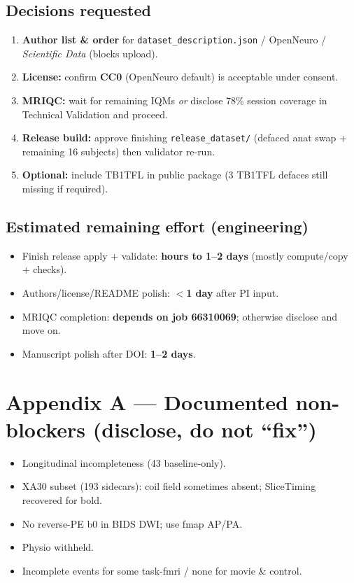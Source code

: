 \documentclass[11pt,a4paper]{article}
\begin{document}
\subsection*{Decisions requested}

\begin{enumerate}[leftmargin=1.3em,itemsep=4pt]
\item \textbf{Author list \& order} for \texttt{dataset\_description.json} / OpenNeuro / \textit{Scientific Data} (blocks upload).
\item \textbf{License:} confirm \textbf{CC0} (OpenNeuro default) is acceptable under consent.
\item \textbf{MRIQC:} wait for remaining IQMs \emph{or} disclose 78\% session coverage in Technical Validation and proceed.
\item \textbf{Release build:} approve finishing \texttt{release\_dataset/} (defaced anat swap + remaining 16 subjects) then validator re-run.
\item \textbf{Optional:} include TB1TFL in public package (3 TB1TFL defaces still missing if required).
\end{enumerate}

\subsection*{Estimated remaining effort (engineering)}
\begin{itemize}[leftmargin=1.2em,itemsep=1pt]
\item Finish release apply + validate: \textbf{hours to 1--2 days} (mostly compute/copy + checks).
\item Authors/license/README polish: \textbf{$<$1 day} after PI input.
\item MRIQC completion: \textbf{depends on job 66310069}; otherwise disclose and move on.
\item Manuscript polish after DOI: \textbf{1--2 days}.
\end{itemize}

\section*{Appendix A --- Documented non-blockers (disclose, do not ``fix'')}
\begin{itemize}[leftmargin=1.2em,itemsep=1pt]
\item Longitudinal incompleteness (43 baseline-only).
\item XA30 subset (193 sidecars): coil field sometimes absent; SliceTiming recovered for bold.
\item No reverse-PE b0 in BIDS DWI; use fmap AP/PA.
\item Physio withheld.
\item Incomplete events for some task-fmri / none for movie \& control.
\end{itemize}
\end{document}
